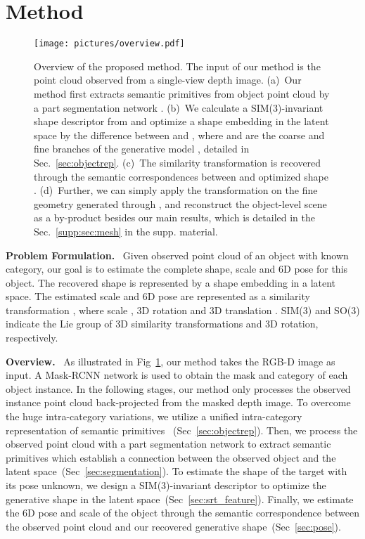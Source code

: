 \documentclass{article}
\begin{document}
 \section{Method}
\begin{figure}[t]
    \centering
    \setlength{\abovecaptionskip}{0.cm}
    \texttt{[image: pictures/overview.pdf]}
    \caption{Overview of the proposed method. 
    The input of our method is the point cloud observed from a single-view depth image.
(a)~Our method first extracts semantic primitives  from object point cloud  by a part segmentation network . (b)~We calculate a SIM(3)-invariant shape descriptor  from  and optimize a shape embedding  in the latent space by the difference between  and , where  and  are the coarse and fine branches of the generative model , detailed in Sec.~\ref{sec:objectrep}. (c)~The similarity transformation  is recovered through the semantic correspondences between  and optimized shape .
    (d)~Further, we can simply apply the transformation  on the fine geometry generated through , and reconstruct the object-level scene as a by-product besides our main results, which is detailed in the Sec.~\ref{supp:sec:mesh} in the supp. material. 
    }
    \label{fig:overview}
\vspace{-0.4cm}
\end{figure}

\textbf{Problem Formulation.}~
Given observed point cloud  of an object with  known category, our goal is to estimate the complete shape, scale and 6D pose for this object. The recovered shape is represented by a shape embedding  in a latent space. The estimated scale and 6D pose are represented as a similarity transformation , where scale , 3D rotation  and 3D translation . SIM(3) and SO(3) indicate the Lie group of 3D similarity transformations and 3D rotation, respectively.

\textbf{Overview.}~
As illustrated in Fig~\ref{fig:overview}, our method takes the RGB-D image as input. 
A Mask-RCNN\cite{he2017mask} network is used to obtain the mask and category of each object instance. In the following stages, our method only processes the observed instance point cloud back-projected from the masked depth image. 
To overcome the huge intra-category variations, 
we utilize a unified intra-category representation of semantic primitives ~(Sec~\ref{sec:objectrep}). 
Then, we process the observed point cloud with a part segmentation network to extract semantic primitives which establish a connection between the observed object and the latent space~(Sec~\ref{sec:segmentation}). 
To estimate the shape of the target with its pose unknown, we design a SIM(3)-invariant descriptor to optimize the generative shape in the latent space~(Sec~\ref{sec:srt_feature}). 
Finally, we estimate the 6D pose and scale of the object through the semantic correspondence between the observed point cloud and our recovered generative shape~(Sec~\ref{sec:pose}).
\end{document}
